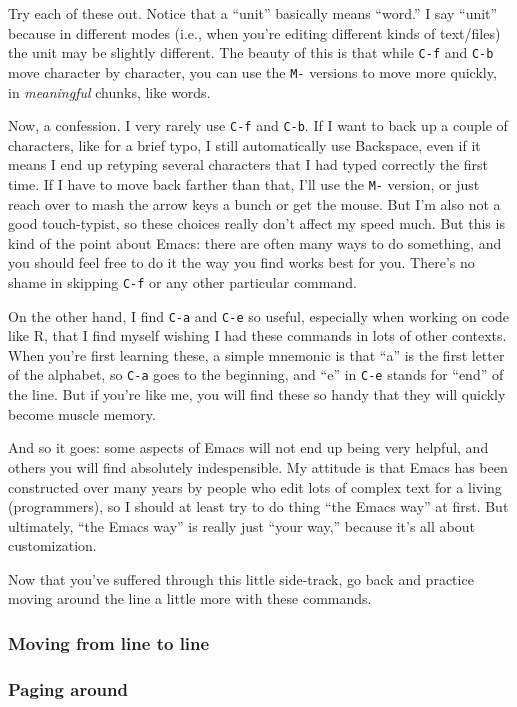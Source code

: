 \documentclass{article}
\begin{document}
Try each of these out.  Notice that a ``unit'' basically means ``word.'' I say ``unit'' because in different modes (i.e., when you're editing different kinds of text/files) the unit may be slightly different. The beauty of this is that while \texttt{C-f} and \texttt{C-b} move character by character, you can use the \texttt{M-} versions to move more quickly, in \emph{meaningful} chunks, like words.

Now, a confession. I very rarely use \texttt{C-f} and \texttt{C-b}. If I want to back up a couple of characters, like for a brief typo, I still automatically use Backspace, even if it means I end up retyping several characters that I had typed correctly the first time. If I have to move back farther than that, I'll use the \texttt{M-} version, or just reach over to mash the arrow keys a bunch or get the mouse.  But I'm also not a good touch-typist, so these choices really don't affect my speed much. But this is kind of the point about Emacs: there are often many ways to do something, and you should feel free to do it the way you find works best for you.  There's no shame in skipping \texttt{C-f} or any other particular command.

On the other hand, I find \texttt{C-a} and \texttt{C-e} so useful, especially when working on code like R, that I find myself wishing I had these commands in lots of other contexts.  When you're first learning these, a simple mnemonic is that ``a'' is the first letter of the alphabet, so \texttt{C-a} goes to the beginning, and ``e'' in \texttt{C-e} stands for ``end'' of the line.  But if you're like me, you will find these so handy that they will quickly become muscle memory.

And so it goes: some aspects of Emacs will not end up being very helpful, and others you will find absolutely indespensible. My attitude is that Emacs has been constructed over many years by people who edit lots of complex text for a living (programmers), so I should at least try to do thing ``the Emacs way'' at first.  But ultimately, ``the Emacs way'' is really just ``your way,'' because it's all about customization.

Now that you've suffered through this little side-track, go back and practice moving around the line a little more with these commands.
\subsubsection{Moving from line to line}
\label{sec-4-2-13}
\subsubsection{Paging around}
\label{sec-4-2-14}
\end{document}
